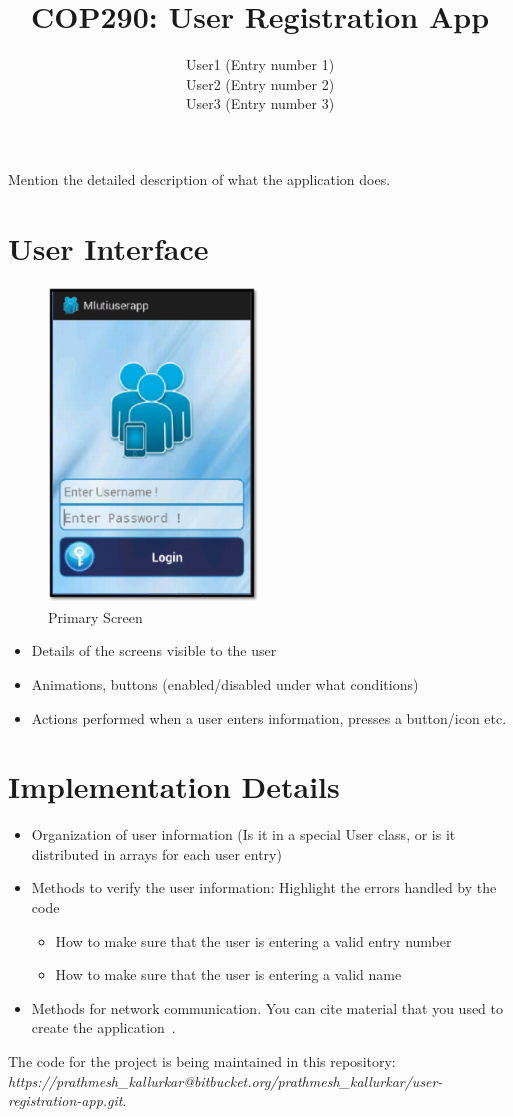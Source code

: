 \documentclass[12pt]{article}
\title{COP290: User Registration App}
\author{User1 (Entry number 1) \\ User2 (Entry number 2) \\ User3 (Entry number 3) }
\begin{document}
\maketitle

Mention the detailed description of what the application does.

\section{User Interface}

\begin{figure}[!ht]
	\centering
	\includegraphics[width=0.5\textwidth]{./UserInterface}
	\caption{Primary Screen}
\end{figure}

\begin{itemize}
\item Details of the screens visible to the user
\item Animations, buttons (enabled/disabled under what conditions)
\item Actions performed when a user enters information, presses a button/icon etc.
\end{itemize}

\section{Implementation Details}

\begin{itemize}
\item Organization of user information (Is it in a special User class, or is it distributed in arrays for each user entry)
\item Methods to verify the user information: Highlight the errors handled by the code
	\begin{itemize}
		\item How to make sure that the user is entering a valid entry number
		\item How to make sure that the user is entering a valid name
	\end{itemize}
\item Methods for network communication. You can cite material that you used to create the application~\cite{android_network_tutorial}.
\end{itemize}

The code for the project is being maintained in this repository: {\em https://prathmesh\_kallurkar@bitbucket.org/prathmesh\_kallurkar/user-registration-app.git}.



\end{document}
